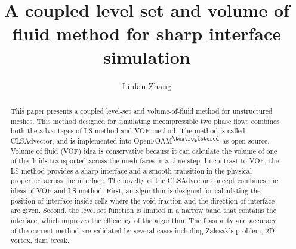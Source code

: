 \documentclass[10pt,onecolumn,a4paper]{article}
\begin{document}
\title{A coupled level set and volume of fluid method for sharp interface simulation}
\author{Linfan Zhang}
\maketitle
\begin{abstract}
 This paper presents a coupled level-set and volume-of-fluid method for unstructured meshes. This method designed for simulating incompressible two phase flows combines both the advantages of LS method and VOF method. The method is called CLSAdvector, and is implemented into OpenFOAM$^{\textregistered}$ as open source. Volume of fluid (VOF) idea is conservative because it can calculate the volume of one of the fluids transported across the mesh faces in a time step. In contrast to VOF, the LS method provides a sharp interface and a smooth transition in the physical properties across the interface. The novelty of the CLSAdvector concept combines the ideas of VOF and LS method. First, an algorithm is designed for calculating the position of interface inside cells where the void fraction and the direction of interface are given. Second, the level set function is limited in a narrow band that contains the interface, which improves the efficiency of the algorithm. The feasibility and accuracy of the current method are validated by several cases including Zalesak's problem, 2D vortex, dam break.
\end{abstract}











\end{document}
